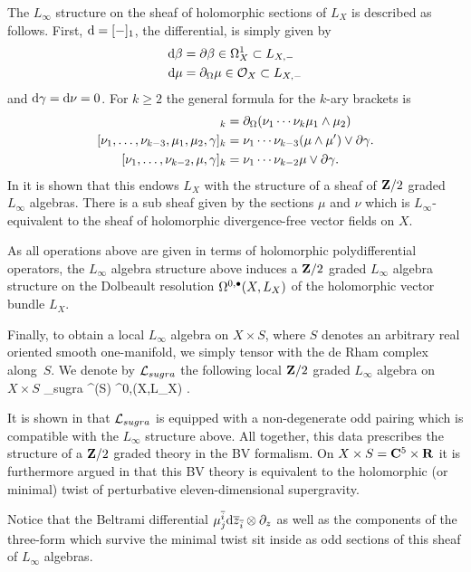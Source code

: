 \documentclass[11pt]{amsart}%
\begin{document}
The $L_\infty$ structure on the sheaf of holomorphic sections of $L_X$ is described as follows. 
First, ${\rm d} = [-]_1$, the differential, is simply given by 
\begin{align*}
{\rm d} \beta & = \partial \beta \in \Omega^1_X \subset L_{X,-} \\
{\rm d} \mu & = \partial_{\Omega} \mu \in \mathcal O_X \subset L_{X, -}
\end{align*}
and ${\rm d} \gamma = {\rm d} \nu = 0$. 
For $k \geq 2$ the general formula for the $k$-ary brackets is 
\begin{align*}
[\nu_1, \ldots, \nu_{k-2}, \mu_1,\mu_2]_{k} & = \div(\nu_1 \cdots \nu_k \mu_1 \wedge \mu_2) \\
[\nu_1,\ldots, \nu_{k-3}, \mu_1,\mu_2,\gamma]_k & = \nu_1 \cdots \nu_{k-3} (\mu \wedge \mu') \vee \del \gamma .\\
[\nu_1,\ldots,\nu_{k-2}, \mu, \gamma]_k & = \nu_1 \cdots \nu_{k-2} \mu \vee \del \gamma .
\end{align*}
In \cite{RSW} it is shown that this endows $L_{X}$ with the structure of a sheaf of $\mathbf{Z}/2$ graded $L_\infty$ algebras.
There is a sub sheaf given by the sections $\mu$ and $\nu$ which is $L_\infty$-equivalent to the sheaf of holomorphic divergence-free vector fields on $X$. 

As all operations above are given in terms of holomorphic polydifferential operators, the $L_\infty$ algebra structure above induces a $\mathbf{Z}/2$ graded $L_\infty$ algebra structure on the Dolbeault resolution $\Omega^{0,\bullet}(X,L_X)$ of the holomorphic vector bundle $L_X$.

Finally, to obtain a local $L_\infty$ algebra on $X \times S$, where $S$ denotes an arbitrary real oriented smooth one-manifold, we simply tensor with the de Rham complex along~$S$.
We denote by $\mathcal L_{sugra}$ the following local $\mathbf{Z}/2$ graded $L_\infty$ algebra on $X \times S$
\beqn
\cL_{sugra}  \Omega^\bu(S) \hotimes \Omega^{0,\bu}(X,L_X) .
\eeqn

\parsec[s:rsw]
It is shown in \cite{RSW} that $\mathcal L_{sugra}$ is equipped with a non-degenerate odd pairing which is compatible with the $L_\infty$ structure above. 
All together, this data prescribes the structure of a $\mathbf{Z}/2$ graded theory in the BV formalism. 
On $X \times S = \mathbf{C}^5 \times \mathbf{R}$ it is furthermore argued in \cite{RSW} that this BV theory is equivalent to the holomorphic (or minimal) twist of perturbative eleven-dimensional supergravity. 

Notice that the Beltrami differential $\mu^{\overline{i}}_j {\rm d} \overline{z}_{\overline{i}} \otimes \partial_z$ as well as the components of the three-form which survive the minimal twist sit inside as odd sections of this sheaf of $L_\infty$ algebras. 
\end{document}
